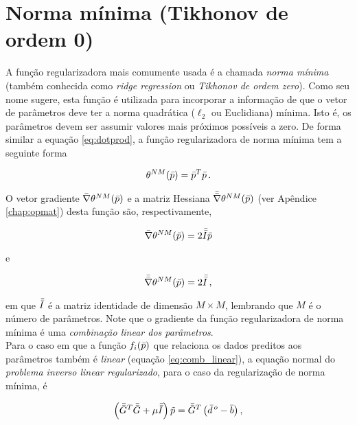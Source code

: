 \section{Norma mínima (Tikhonov de ordem 0)}

A função regularizadora mais comumente usada é a chamada {\it norma mínima}
(também conhecida como {\it ridge regression} ou {\it Tikhonov de ordem zero}).
Como seu nome sugere, esta função é utilizada para incorporar a informação de
que o vetor de parâmetros deve ter a norma quadrática ($\ell_2$ ou Euclidiana)
mínima.
Isto é, os parâmetros devem ser assumir valores mais próximos possíveis a zero.
De forma similar a equação \ref{eq:dotprod}, a função regularizadora de norma
mínima tem a seguinte forma

\begin{equation}
\theta^{NM}(\bar{p}) = \bar{p}^T\bar{p} \thinspace .
\label{eq:norma_minima}
\end{equation}

\indent O vetor gradiente $\bar{\nabla}\theta^{NM}(\bar{p})$ e a matriz Hessiana
$\bar{\bar{\nabla}}\theta^{NM}(\bar{p})$ (ver Apêndice \ref{chap:opmat}) desta função
são, respectivamente,

\begin{equation}
\bar{\nabla}\theta^{NM}(\bar{p}) = 2\bar{\bar{I}}\bar{p}
\label{eq:grad_norma_minima}
\end{equation}

\noindent e

\begin{equation}
\bar{\bar{\nabla}}\theta^{NM}(\bar{p}) = 2\bar{\bar{I}} \thinspace ,
\label{eq:hessian_norma_minima}
\end{equation}

\noindent em que $\bar{\bar{I}}$ é a matriz identidade de dimensão $M \times M$,
lembrando que $M$ é o número de parâmetros.
Note que o gradiente da função regularizadora de norma mínima é uma
{\it combinação linear dos parâmetros}.
\\
\indent Para o caso em que a função $f_i(\bar{p})$ que relaciona
os dados preditos aos parâmetros também é {\it linear} (equação \ref{eq:comb_linear}),
a equação normal do {\it problema inverso linear regularizado},
para o caso da regularização de norma mínima, é

\begin{equation}
\left(\bar{\bar{G}}^T\bar{\bar{G}} + \mu\bar{\bar{I}}\right)\tilde{p} =
    \bar{\bar{G}}^T\left(\bar{d}^{\thinspace o} - \bar{b} \right) ,
\label{eq:sistema_normal_norma_min_linear}
\end{equation}

